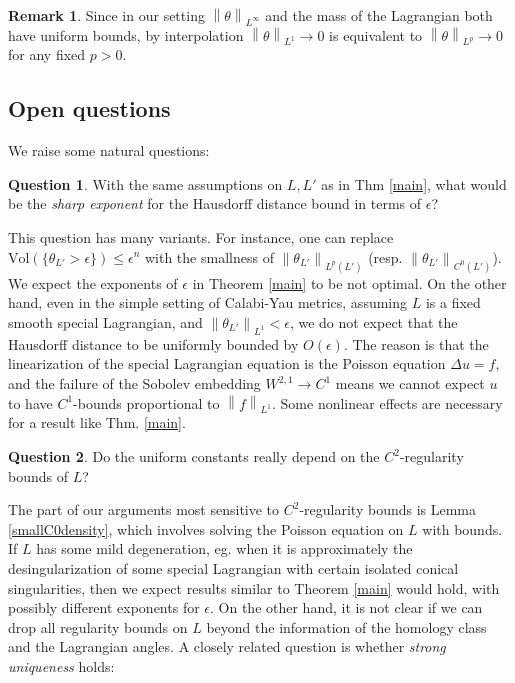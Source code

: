 \documentclass[a4paper]{article}
\theoremstyle{definition}
\newtheorem{rmk}{Remark}
\newtheorem{Question}{Question}
\newcommand{\norm}[1]{\left\lVert#1\right\rVert}
\newcommand{\Lap}{\Delta}
\begin{document}
\begin{rmk}
Since in our setting $\norm{\theta}_{L^\infty}$ and the mass of the Lagrangian both have uniform bounds, by interpolation $\norm{\theta}_{L^1}\to 0$ is equivalent to $\norm{\theta}_{L^p}\to 0$ for any fixed $p>0$.
\end{rmk}





\subsection{Open questions}




We raise some natural questions:


\begin{Question}
With the same assumptions on $L, L'$ as in Thm \ref{main},  what would be the \emph{sharp exponent} for the Hausdorff distance bound in terms of $\epsilon$? 
\end{Question}


This question has many variants. For instance, one can replace $\text{Vol}(\{ \theta_{L'}>\epsilon  \})\leq \epsilon^n$ with the smallness of  $\norm{\theta_{L'}}_{L^p(L')}$ (resp. $\norm{\theta_{L'}}_{C^0(L')}$). We expect the exponents of $\epsilon$ in Theorem \ref{main} to be not optimal. On the other hand, even in the simple setting of Calabi-Yau metrics, assuming $L$ is a fixed smooth special Lagrangian, and $\norm{\theta_{L'}}_{L^1}<\epsilon$, we do not expect that the Hausdorff distance to be uniformly bounded by $O(\epsilon)$. The reason is that the linearization of the special Lagrangian equation is the Poisson equation $\Lap u= f$, and the failure of the Sobolev embedding $W^{2,1}\to C^1$ means we cannot expect $u$ to have $C^1$-bounds proportional to $\norm{f}_{L^1}$. Some nonlinear effects are necessary for a result like Thm. \ref{main}.








\begin{Question}
Do the uniform constants really depend on the $C^2$-regularity bounds of $L$? 
\end{Question}



The part of our arguments most sensitive to $C^2$-regularity bounds is Lemma \ref{smallC0density}, which involves solving the Poisson equation on $L$ with bounds. If $L$ has some mild degeneration, eg. when it is approximately the desingularization of some special Lagrangian with certain isolated conical singularities, then we expect results similar to Theorem \ref{main} would hold, with possibly different exponents for $\epsilon$. On the other hand, it is not clear if we can drop all regularity bounds on $L$ beyond the information of the homology class and the Lagrangian angles. A closely related question is whether \emph{strong uniqueness} holds:
\end{document}

